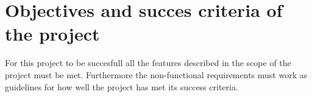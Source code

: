 \section{Objectives and succes criteria of the project}
For this project to be succesfull all the features described in the scope of the project must be met. Furthermore the non-functional requirements must work as guidelines for how well the project has met its success criteria. 